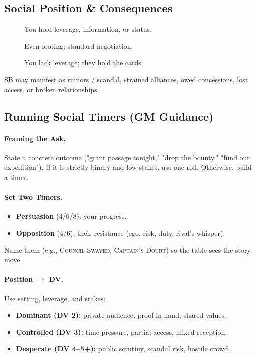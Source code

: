 \subsection{Social Position \& Consequences}\label{subsec:social_position}
\begin{description}
    \item[] You hold leverage, information, or status.
    \item[] Even footing; standard negotiation.
    \item[] You lack leverage; they hold the cards.
\end{description}
SB may manifest as rumors / scandal, strained alliances, owed concessions, lost access, or broken relationships.

\subsection{Running Social Timers (GM Guidance)}\label{subsec:social_timers}

\paragraph{Framing the Ask.}
State a concrete outcome ("grant passage tonight," "drop the bounty," "fund our expedition"). If it is strictly binary and low‑stakes, use one roll. Otherwise, build a timer.

\paragraph{Set Two Timers.}
\begin{itemize}
    \item \textbf{Persuasion} (4/6/8): your progress.
    \item \textbf{Opposition} (4/6): their resistance (ego, risk, duty, rival's whisper).
\end{itemize}
Name them (e.g., \textsc{Council Swayed}, \textsc{Captain's Doubt}) so the table sees the story move.

\paragraph{Position $\rightarrow$ DV.}
Use setting, leverage, and stakes:
\begin{itemize}
    \item \textbf{Dominant (DV 2):} private audience, proof in hand, shared values.
    \item \textbf{Controlled (DV 3):} time pressure, partial access, mixed reception.
    \item \textbf{Desperate (DV 4--5+):} public scrutiny, scandal risk, hostile crowd.
\end{itemize}

